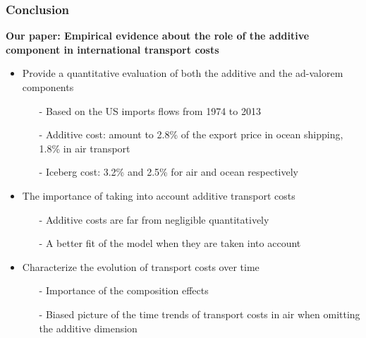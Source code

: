 \documentclass[10 pt,Helvetica, french]{beamer}
\begin{document}
\begin{frame}
\frametitle{Conclusion}
\textbf{Our paper: Empirical evidence about the role of the additive component in international transport costs} \vspace{0.1cm}
\begin{itemize}
\item Provide a quantitative evaluation of both the additive and the ad-valorem components \vspace{0.1cm}
\begin{itemize}
\item[-] Based on the US imports flows from 1974 to 2013 \vspace{0.1cm}
\item[-] Additive cost: amount to 2.8\% of the export price in ocean shipping, 1.8\% in air transport \vspace{0.1cm}
\item[-] Iceberg cost: 3.2\% and 2.5\% for air and ocean respectively \vspace{0.1cm}
\end{itemize}
\item The importance of taking into account additive transport costs \vspace{0.1cm}
\begin{itemize}
\item[-] Additive costs are far from negligible quantitatively \vspace{0.1cm}
\item[-] A better fit of the model when they are taken into account    \vspace{0.1cm}
\end{itemize}
\item Characterize the evolution of transport costs over time \vspace{0.1cm}
\begin{itemize}
\item[-] Importance of the composition effects \vspace{0.1cm}
\item[-] Biased picture of the time trends of transport costs in air when omitting the additive dimension
\end{itemize}
\end{itemize}

\end{frame}
\end{document}
